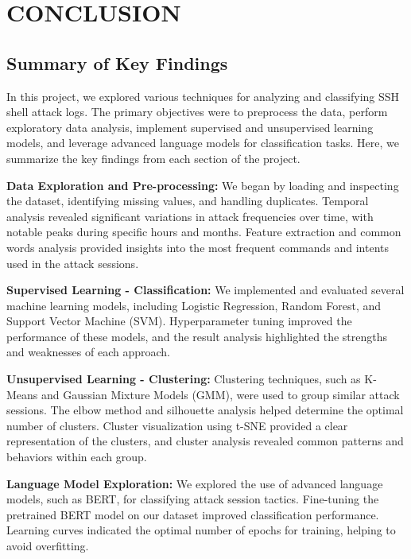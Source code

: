 

\section{CONCLUSION}


    \subsection{Summary of Key Findings}
    
        In this project, we explored various techniques for analyzing and classifying SSH shell attack logs. The primary objectives were to preprocess the data, perform exploratory data analysis, implement supervised and unsupervised learning models, and leverage advanced language models for classification tasks. Here, we summarize the key findings from each section of the project.

        \textbf{Data Exploration and Pre-processing:} We began by loading and inspecting the dataset, identifying missing values, and handling duplicates. Temporal analysis revealed significant variations in attack frequencies over time, with notable peaks during specific hours and months. Feature extraction and common words analysis provided insights into the most frequent commands and intents used in the attack sessions.

        \textbf{Supervised Learning - Classification:} We implemented and evaluated several machine learning models, including Logistic Regression, Random Forest, and Support Vector Machine (SVM). Hyperparameter tuning improved the performance of these models, and the result analysis highlighted the strengths and weaknesses of each approach.

        \textbf{Unsupervised Learning - Clustering:} Clustering techniques, such as K-Means and Gaussian Mixture Models (GMM), were used to group similar attack sessions. The elbow method and silhouette analysis helped determine the optimal number of clusters. Cluster visualization using t-SNE provided a clear representation of the clusters, and cluster analysis revealed common patterns and behaviors within each group.

        \textbf{Language Model Exploration:} We explored the use of advanced language models, such as BERT, for classifying attack session tactics. Fine-tuning the pretrained BERT model on our dataset improved classification performance. Learning curves indicated the optimal number of epochs for training, helping to avoid overfitting.

